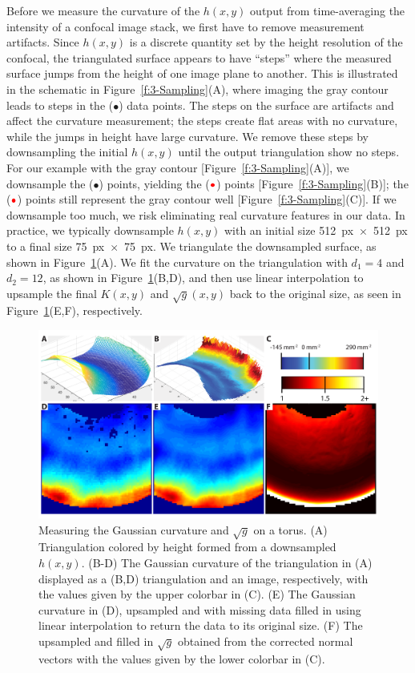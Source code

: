 Before we measure the curvature of the $h(x,y)$ output from time-averaging the intensity of a confocal image stack, we first have to remove measurement artifacts.
Since $h(x,y)$ is a discrete quantity set by the height resolution of the confocal, the triangulated surface appears to have ``steps'' where the measured surface jumps from the height of one image plane to another.
This is illustrated in the schematic in Figure~\ref{f:3-Sampling}(A), where imaging the gray contour leads to steps in the (${\bullet}$) data points.
The steps on the surface are artifacts and affect the curvature measurement; the steps create flat areas with no curvature, while the jumps in height have large curvature.
We remove these steps by downsampling the initial $h(x,y)$ until the output triangulation show no steps.
For our example with the gray contour [Figure~\ref{f:3-Sampling}(A)], we downsample the (${\bullet}$) points, yielding the (${\color{red} \bullet}$) points [Figure~\ref{f:3-Sampling}(B)]; the (${\color{red} \bullet}$) points still represent the gray contour well [Figure~\ref{f:3-Sampling}(C)].
If we downsample too much, we risk eliminating real curvature features in our data.
In practice, we typically downsample $h(x,y)$ with an initial size 512~px~$\times$~512~px to a final size 75~px~$\times$~75~px.
We triangulate the downsampled surface, as shown in Figure~\ref{f:3-CurvFitTorus}(A).
We fit the curvature on the triangulation with $d_1 = 4$ and $d_2 = 12$, as shown in Figure~\ref{f:3-CurvFitTorus}(B,D), and then use linear interpolation to upsample the final $K(x,y)$ and $\sqrt{g}(x,y)$ back to the original size, as seen in Figure~\ref{f:3-CurvFitTorus}(E,F), respectively.
\begin{figure}
  \centering
  \includegraphics{figures/C3/Ch3-Figs_CurvFitTorus.png}
  \caption{Measuring the Gaussian curvature and $\sqrt{g}$ on a torus.
  (A) Triangulation colored by height formed from a downsampled $h(x,y)$.
  (B-D) The Gaussian curvature of the triangulation in (A) displayed as a (B,D) triangulation and an image, respectively, with the values given by the upper colorbar in (C).
  (E) The Gaussian curvature in (D), upsampled and with missing data filled in using linear interpolation to return the data to its original size.
  (F) The upsampled and filled in $\sqrt{g}$ obtained from the corrected normal vectors with the values given by the lower colorbar in (C).}\label{f:3-CurvFitTorus}
\end{figure}




